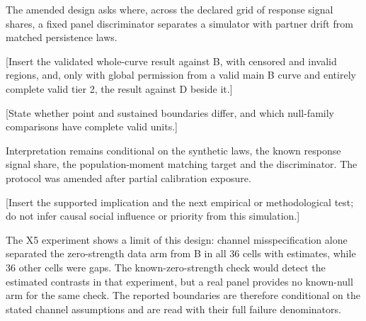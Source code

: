 The amended design asks where, across the declared grid of response signal shares, a fixed panel discriminator separates a simulator with partner drift from matched persistence laws.

[Insert the validated whole-curve result against B, with censored and invalid regions, and, only with global permission from a valid main B curve and entirely complete valid tier 2, the result against D beside it.]

[State whether point and sustained boundaries differ, and which null-family comparisons have complete valid units.]

Interpretation remains conditional on the synthetic laws, the known response signal share, the population-moment matching target and the discriminator. The protocol was amended after partial calibration exposure.

[Insert the supported implication and the next empirical or methodological test; do not infer causal social influence or priority from this simulation.]


The X5 experiment shows a limit of this design: channel misspecification alone separated the zero-strength data arm from B in all 36 cells with estimates, while 36 other cells were gaps. %
The known-zero-strength check would detect the estimated contrasts in that experiment, but a real panel provides no known-null arm for the same check. %
The reported boundaries are therefore conditional on the stated channel assumptions and are read with their full failure denominators. %
